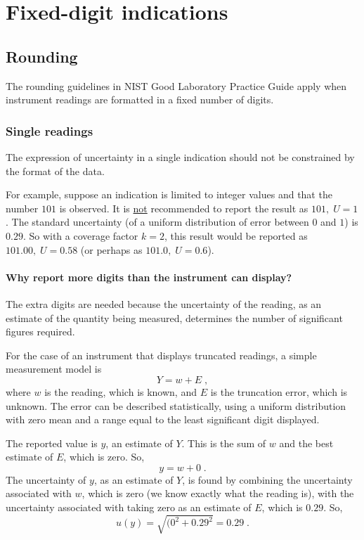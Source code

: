 \section{Fixed-digit indications}
\subsection{Rounding}
The rounding guidelines in NIST Good Laboratory Practice Guide \cite{GLP9}  apply when instrument readings are formatted in a fixed number of digits.

\subsubsection{Single readings}

The expression of uncertainty in a single indication should not be constrained by the format of the data.  

For example, suppose an indication is limited to integer values and that the number $101$ is observed. It is \underline{not} recommended to report the result as $101,\; U=1$. The standard uncertainty (of a uniform distribution of error between $0$ and $1$) is $0.29$. So with a coverage factor $k=2$, this result would be reported as $101.00,\; U=0.58$ (or perhaps as $101.0,\; U=0.6$).

\paragraph{Why report more digits than the instrument can display?} 
The extra digits are needed because the uncertainty of the reading, as an estimate of the quantity being measured, determines the number of significant figures required.

For the case of an instrument that displays truncated readings, a simple measurement model is \[
Y=w+E\;,
\]
where $w$ is the reading, which is known, and $E$ is the truncation error, which is unknown. The error can be described statistically, using a uniform distribution with zero mean and a range equal to the least significant digit displayed. 

The reported value is $y$, an estimate of $Y$. This is the sum of $w$ and the best estimate of $E$, which is zero.  So, \[
y=w+0\;.
\]
The uncertainty of $y$, as an estimate of $Y$, is found by combining the uncertainty associated with $w$, which is zero (we know exactly what the reading is), with the uncertainty associated with taking zero as an estimate of $E$, which is $0.29$. So,\[
u(y)= \sqrt{(0^2+0.29^2 }=0.29\;.  
\]

